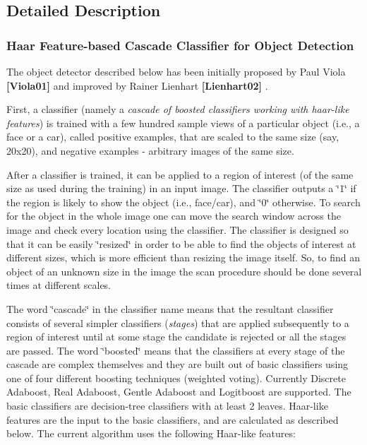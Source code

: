 \subsection{Detailed Description}
\subsubsection*{Haar Feature-\/based Cascade Classifier for Object Detection }

The object detector described below has been initially proposed by Paul Viola {\bfseries [Viola01]} and improved by Rainer Lienhart {\bfseries [Lienhart02]} . 

First, a classifier (namely a {\itshape cascade of boosted classifiers working with haar-\/like features}) is trained with a few hundred sample views of a particular object (i.\+e., a face or a car), called positive examples, that are scaled to the same size (say, 20x20), and negative examples -\/ arbitrary images of the same size. 

After a classifier is trained, it can be applied to a region of interest (of the same size as used during the training) in an input image. The classifier outputs a \char`\"{}1\char`\"{} if the region is likely to show the object (i.\+e., face/car), and \char`\"{}0\char`\"{} otherwise. To search for the object in the whole image one can move the search window across the image and check every location using the classifier. The classifier is designed so that it can be easily \char`\"{}resized\char`\"{} in order to be able to find the objects of interest at different sizes, which is more efficient than resizing the image itself. So, to find an object of an unknown size in the image the scan procedure should be done several times at different scales. 

The word \char`\"{}cascade\char`\"{} in the classifier name means that the resultant classifier consists of several simpler classifiers ({\itshape stages}) that are applied subsequently to a region of interest until at some stage the candidate is rejected or all the stages are passed. The word \char`\"{}boosted\char`\"{} means that the classifiers at every stage of the cascade are complex themselves and they are built out of basic classifiers using one of four different boosting techniques (weighted voting). Currently Discrete Adaboost, Real Adaboost, Gentle Adaboost and Logitboost are supported. The basic classifiers are decision-\/tree classifiers with at least 2 leaves. Haar-\/like features are the input to the basic classifiers, and are calculated as described below. The current algorithm uses the following Haar-\/like features\+: 


